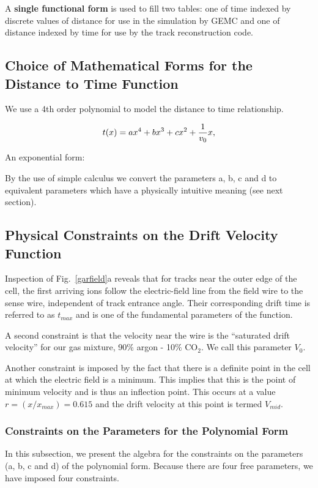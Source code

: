 A {\bf single functional form} is used to fill two tables: one of time indexed by discrete
values of distance for use in the simulation by GEMC and one of 
distance indexed by time for use by the track reconstruction code.


\subsection{Choice of Mathematical Forms for the Distance to Time Function}
We use a 4th order polynomial to model the distance to time relationship.

\begin{equation}
t(x) =  a x^4 + b x^3 + c x^2 + {1 \over v_0} x,
\end{equation}
\item An exponential form:

By the use of simple calculus we convert the parameters a, b, c and d to equivalent parameters which have
a physically intuitive meaning (see next section).

\subsection{Physical Constraints on the Drift Velocity Function}

Inspection of  Fig.~\ref{garfield}a reveals that for tracks near the outer
edge of the cell, the first arriving ions follow the electric-field line from 
the field wire to the sense wire, independent of track entrance angle.  Their 
corresponding drift time is referred to as $t_{max}$ and is one of the fundamental
parameters of the function. 

A second constraint is that the velocity near the wire is the ``saturated drift
velocity'' for our gas mixture, 90$\%$ argon - 10$\%$ CO$_2$.  We call this parameter $V_0$.

Another constraint is imposed by the fact that there is a definite point in the
cell at which the electric field is a minimum.  This implies that this is the point
of minimum velocity and is thus an inflection point.  This occurs at a value
$r = (x/x_{max}) = 0.615$ and the drift velocity at this point is termed $V_{mid}$.

\subsubsection{Constraints on the Parameters for the Polynomial Form}
In this subsection, we present the algebra for the constraints on the parameters
(a, b, c and d) of the polynomial form.  Because there are four free parameters, we
have imposed four constraints.

